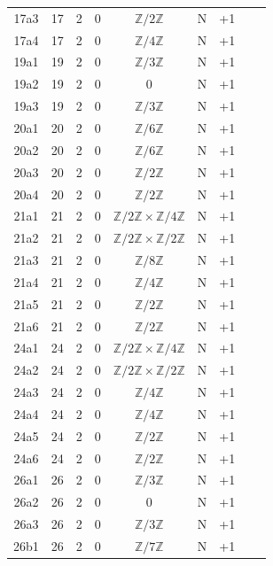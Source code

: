 \begin{longtable}{ccccccccc}
17a3 & 17 & 2 & 0 & $\mathbb{Z}/2\mathbb{Z}$ & N & +1 &  &  \\
17a4 & 17 & 2 & 0 & $\mathbb{Z}/4\mathbb{Z}$ & N & +1 &  &  \\
19a1 & 19 & 2 & 0 & $\mathbb{Z}/3\mathbb{Z}$ & N & +1 &  &  \\
19a2 & 19 & 2 & 0 & 0 & N & +1 &  &  \\
19a3 & 19 & 2 & 0 & $\mathbb{Z}/3\mathbb{Z}$ & N & +1 &  &  \\
20a1 & 20 & 2 & 0 & $\mathbb{Z}/6\mathbb{Z}$ & N & +1 &  &  \\
20a2 & 20 & 2 & 0 & $\mathbb{Z}/6\mathbb{Z}$ & N & +1 &  &  \\
20a3 & 20 & 2 & 0 & $\mathbb{Z}/2\mathbb{Z}$ & N & +1 &  &  \\
20a4 & 20 & 2 & 0 & $\mathbb{Z}/2\mathbb{Z}$ & N & +1 &  &  \\
21a1 & 21 & 2 & 0 & $\mathbb{Z}/2\mathbb{Z} \times \mathbb{Z}/4\mathbb{Z}$ & N & +1 &  &  \\
21a2 & 21 & 2 & 0 & $\mathbb{Z}/2\mathbb{Z} \times \mathbb{Z}/2\mathbb{Z}$ & N & +1 &  &  \\
21a3 & 21 & 2 & 0 & $\mathbb{Z}/8\mathbb{Z}$ & N & +1 &  &  \\
21a4 & 21 & 2 & 0 & $\mathbb{Z}/4\mathbb{Z}$ & N & +1 &  &  \\
21a5 & 21 & 2 & 0 & $\mathbb{Z}/2\mathbb{Z}$ & N & +1 &  &  \\
21a6 & 21 & 2 & 0 & $\mathbb{Z}/2\mathbb{Z}$ & N & +1 &  &  \\
24a1 & 24 & 2 & 0 & $\mathbb{Z}/2\mathbb{Z} \times \mathbb{Z}/4\mathbb{Z}$ & N & +1 &  &  \\
24a2 & 24 & 2 & 0 & $\mathbb{Z}/2\mathbb{Z} \times \mathbb{Z}/2\mathbb{Z}$ & N & +1 &  &  \\
24a3 & 24 & 2 & 0 & $\mathbb{Z}/4\mathbb{Z}$ & N & +1 &  &  \\
24a4 & 24 & 2 & 0 & $\mathbb{Z}/4\mathbb{Z}$ & N & +1 &  &  \\
24a5 & 24 & 2 & 0 & $\mathbb{Z}/2\mathbb{Z}$ & N & +1 &  &  \\
24a6 & 24 & 2 & 0 & $\mathbb{Z}/2\mathbb{Z}$ & N & +1 &  &  \\
26a1 & 26 & 2 & 0 & $\mathbb{Z}/3\mathbb{Z}$ & N & +1 &  &  \\
26a2 & 26 & 2 & 0 & 0 & N & +1 &  &  \\
26a3 & 26 & 2 & 0 & $\mathbb{Z}/3\mathbb{Z}$ & N & +1 &  &  \\
26b1 & 26 & 2 & 0 & $\mathbb{Z}/7\mathbb{Z}$ & N & +1 &  &  \\

\end{longtable}

